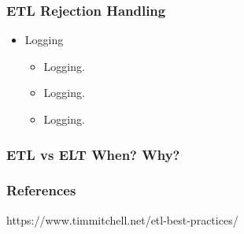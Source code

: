 \begin{frame}
    \frametitle{ETL Rejection Handling}
    \begin{itemize}[<+->]
        \item Logging
        \begin{itemize}[<+->]
            \item  Logging.
            \item  Logging.
            \item  Logging.


        \end{itemize}
    \end{itemize}
\end{frame}


\begin{frame}
    \frametitle{ETL vs ELT When? Why?}
\end{frame}

\begin{frame}
    \frametitle{References}
    https://www.timmitchell.net/etl-best-practices/
\end{frame}




